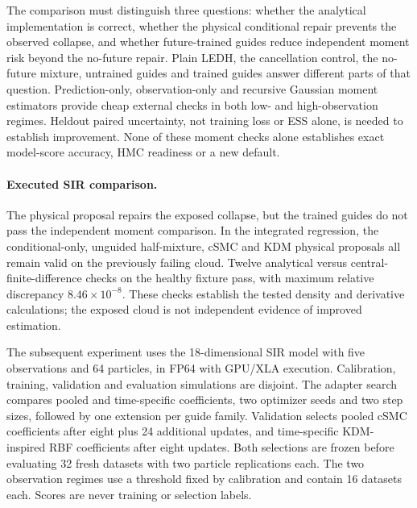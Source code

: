 The comparison must distinguish three questions: whether the analytical
implementation is correct, whether the physical conditional repair prevents
the observed collapse, and whether future-trained guides reduce independent
moment risk beyond the no-future repair. Plain LEDH, the cancellation control,
the no-future mixture, untrained guides and trained guides answer different
parts of that question. Prediction-only, observation-only and recursive
Gaussian moment estimators provide cheap external checks in both low- and
high-observation regimes. Heldout paired uncertainty, not training loss or
ESS alone, is needed to establish improvement. None of these moment checks
alone establishes exact model-score accuracy, HMC readiness or a new default.

\paragraph{Executed SIR comparison.}
The physical proposal repairs the exposed collapse, but the trained guides
do not pass the independent moment comparison. In the integrated regression,
the conditional-only, unguided half-mixture, cSMC and KDM physical proposals
all remain valid on the previously failing cloud. Twelve analytical versus
central-finite-difference checks on the healthy fixture pass, with maximum
relative discrepancy \(8.46\times10^{-8}\). These checks establish the
tested density and derivative calculations; the exposed cloud is not
independent evidence of improved estimation.

The subsequent experiment uses the 18-dimensional SIR model with five
observations and 64 particles, in FP64 with GPU/XLA execution. Calibration,
training, validation and evaluation simulations are disjoint. The adapter
search compares pooled and time-specific coefficients, two optimizer seeds
and two step sizes, followed by one extension per guide family. Validation
selects pooled cSMC coefficients after eight plus 24 additional updates,
and time-specific KDM-inspired RBF coefficients after eight updates. Both selections
are frozen before evaluating 32 fresh datasets with two particle
replications each. The two observation regimes use a threshold fixed by
calibration and contain 16 datasets each. Scores are never training or
selection labels.

